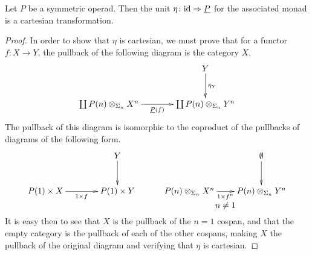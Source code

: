 \begin{prop}\label{cart_unit}
Let $P$ be a symmetric operad. Then the unit $\eta \colon \textrm{id} \Rightarrow \underline{P}$ for the associated monad is a cartesian transformation.
\end{prop}
\begin{proof}
In order to show that $\eta$ is cartesian, we must prove that for a functor $f \colon X \rightarrow Y$, the pullback of the following diagram is the category $X$.
    \[
        \xy
            (40,0)*+{Y}="10";
            (0,-15)*+{\coprod \coeqsig{P}{X}{n}}="01";
            (40,-15)*+{\coprod \coeqsig{P}{Y}{n}}="11";
            {\ar^{\eta_Y} "10" ; "11"};
            {\ar_{\underline{P}(f)} "01" ; "11"};
        \endxy
    \]
The pullback of this diagram is isomorphic to the coproduct of the pullbacks of diagrams of the following form.
\[
        \xy
            (30,0)*+{Y}="10";
            (0,-15)*+{P(1) \times X}="01";
            (30,-15)*+{P(1) \times Y}="11";
            {\ar^{} "10" ; "11"};
            {\ar_{1 \times f} "01" ; "11"};
            (90,0)*+{\emptyset}="60";
            (60,-15)*+{\coeqsig{P}{X}{n}}="51";
            (90,-15)*+{\coeqsig{P}{Y}{n}}="61";
            {\ar^{} "60" ; "61"};
            {\ar_{1 \times f^n} "51" ; "61"};
            (75,-21)*{n \neq 1}
        \endxy
    \]
It is easy then to see that $X$ is the pullback of the $n=1$ cospan, and that the empty category is the pullback of each of the other cospans, making $X$ the pullback of the original diagram and verifying that $\eta$ is cartesian.
\end{proof}


